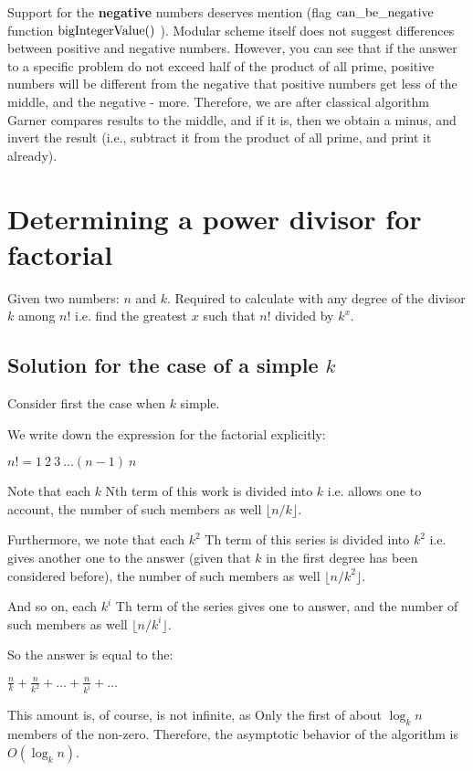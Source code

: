 Support for the \textbf{negative} numbers deserves mention (flag $\rm can \_be \_negative$ function ${\rm bigIntegerValue}()$ ). Modular scheme itself does not suggest differences between positive and negative numbers. However, you can see that if the answer to a specific problem do not exceed half of the product of all prime, positive numbers will be different from the negative that positive numbers get less of the middle, and the negative - more. Therefore, we are after classical algorithm Garner compares results to the middle, and if it is, then we obtain a minus, and invert the result (i.e., subtract it from the product of all prime, and print it already).

\section{ Determining a power divisor for factorial }
Given two numbers: $n$ and $k$. Required to calculate with any degree of the divisor $k$ among $n!$ i.e. find the greatest $x$ such that $n!$ divided by $k ^ x$.

\subsection{ Solution for the case of a simple $k$}

Consider first the case when $k$ simple.

We write down the expression for the factorial explicitly:

$n! = 1\ 2\ 3\ \ldots (n-1)\ n$

Note that each $k$ Nth term of this work is divided into $k$ i.e. allows one to account, the number of such members as well $\lfloor n / k \rfloor$.

Furthermore, we note that each $k ^ 2$ Th term of this series is divided into $k ^ 2$ i.e. gives another one to the answer (given that $k$ in the first degree has been considered before), the number of such members as well $\lfloor n / k ^ 2 \rfloor$.

And so on, each $k ^ i$ Th term of the series gives one to answer, and the number of such members as well $\lfloor n / k ^ i \rfloor$.

So the answer is equal to the:

$\frac{n}{k}+\frac{n}{k^{2}}+\ldots+\frac{n}{k^{i}}+\ldots$

This amount is, of course, is not infinite, as Only the first of about $\log_k n$ members of the non-zero. Therefore, the asymptotic behavior of the algorithm is $O (\log_k n)$.

